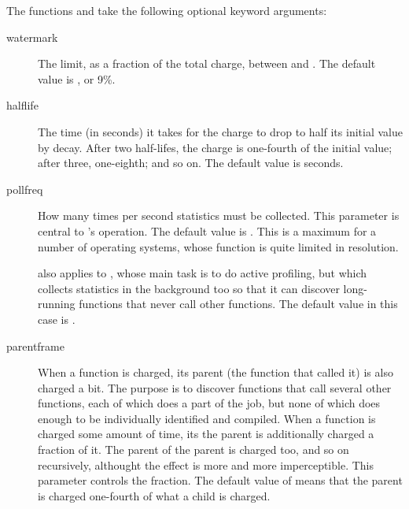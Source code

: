 \documentclass{manual}
\begin{document}
The functions  and  take the following optional keyword arguments:
%
%
\begin{description}

\item[watermark]
  The limit, as a fraction of the total charge, between  and .  The default value is , or 9\%.

\item[halflife]
  The time (in seconds) it takes for the charge to drop to half its initial value by decay.  After two half-lifes, the charge is one-fourth of the initial value; after three, one-eighth; and so on.  The default value is  seconds.
  
\item[pollfreq]
  How many times per second statistics must be collected.  This parameter is central to 's operation.  The default value is .  This is a maximum for a number of operating systems, whose  function is quite limited in resolution.

   also applies to , whose main task is to do active profiling, but which collects statistics in the background too so that it can discover long-running functions that never call other functions.  The default value in this case is .

\item[parentframe]
  When a function is charged, its parent (the function that called it) is also charged a bit.  The purpose is to discover functions that call several other functions, each of which does a part of the job, but none of which does enough to be individually identified and compiled.  When a function is charged some amount of time, its the parent is additionally charged a fraction of it.  The parent of the parent is charged too, and so on recursively, althought the effect is more and more imperceptible.  This parameter controls the fraction.  The default value of  means that the parent is charged one-fourth of what a child is charged.  
  
\end{description}

\end{document}
